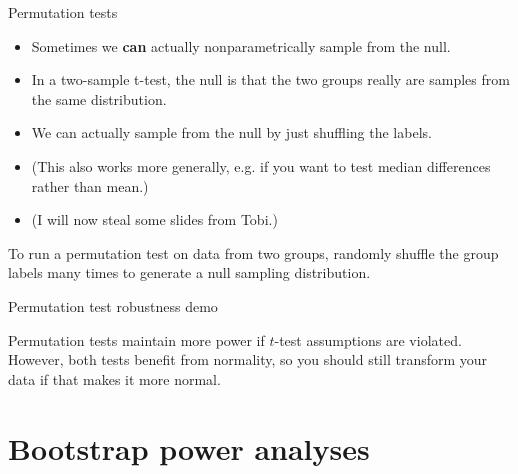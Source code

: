\documentclass{beamer} %
\begin{document}
\begin{frame}{Permutation tests}
\begin{itemize}[<+->] \itemsep 1.5em
\item Sometimes we \textbf{can} actually nonparametrically sample from the null.
\item In a two-sample t-test, the null is that the two groups really are samples from the same distribution. 
\item We can actually sample from the null by just shuffling the labels. 
\item (This also works more generally, e.g. if you want to test median differences rather than mean.) 
\item (I will now steal some slides from Tobi.) 
\end{itemize}
\end{frame}

{

}

\begin{frame}[standout]
To run a permutation test on data from two groups, randomly shuffle the group labels many times to generate a null sampling distribution.
\end{frame}

\begin{frame}{Permutation test robustness demo}
\begin{figure}
\centering
{}
\end{figure}
\end{frame}

\begin{frame}[standout]
Permutation tests maintain more power if $t$-test assumptions are violated. \\[1em]
However, both tests benefit from normality, so you should still transform your data if that makes it more normal. 
\end{frame}

\section{Bootstrap power analyses}
\end{document}
